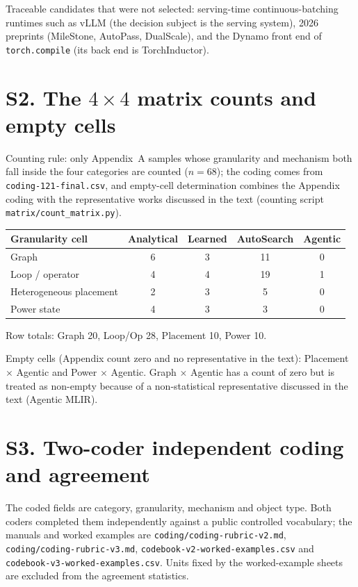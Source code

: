 \documentclass[11pt,a4paper]{article}
\begin{document}
Traceable candidates that were not selected: serving-time continuous-batching runtimes such as vLLM (the decision subject is the serving system), 2026 preprints (MileStone, AutoPass, DualScale), and the Dynamo front end of \texttt{torch.compile} (its back end is TorchInductor).

\section{S2. The $4\times4$ matrix counts and empty cells}
Counting rule: only Appendix~A samples whose granularity and mechanism both fall inside the four categories are counted ($n=68$); the coding comes from \texttt{coding-121-final.csv}, and empty-cell determination combines the Appendix coding with the representative works discussed in the text (counting script \texttt{matrix/count\_matrix.py}).

\begin{center}
\begin{tabular}{lcccc}
\toprule
Granularity cell & Analytical & Learned & AutoSearch & Agentic \\
\midrule
Graph & 6 & 3 & 11 & 0 \\
Loop / operator & 4 & 4 & 19 & 1 \\
Heterogeneous placement & 2 & 3 & 5 & 0 \\
Power state & 4 & 3 & 3 & 0 \\
\bottomrule
\end{tabular}
\end{center}

Row totals: Graph 20, Loop/Op 28, Placement 10, Power 10.

Empty cells (Appendix count zero and no representative in the text): Placement $\times$ Agentic and Power $\times$ Agentic. Graph $\times$ Agentic has a count of zero but is treated as non-empty because of a non-statistical representative discussed in the text (Agentic MLIR).

\section{S3. Two-coder independent coding and agreement}
The coded fields are category, granularity, mechanism and object type. Both coders completed them independently against a public controlled vocabulary; the manuals and worked examples are \texttt{coding/coding-rubric-v2.md}, \texttt{coding/coding-rubric-v3.md}, \texttt{codebook-v2-worked-examples.csv} and \texttt{codebook-v3-worked-examples.csv}. Units fixed by the worked-example sheets are excluded from the agreement statistics.
\end{document}
